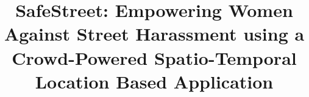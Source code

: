 \documentclass{sig-alternate}
\begin{document}
%

\title{SafeStreet: Empowering Women Against Street Harassment using a Crowd-Powered Spatio-Temporal Location Based Application}

%
%
%
%
%
\end{document}
